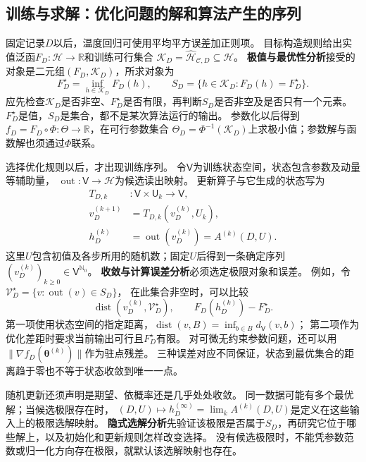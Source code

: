 \subsection{训练与求解：优化问题的解和算法产生的序列}
\label{sec:future-ml-training-solving}

固定记录$D$以后，温度回归可使用平均平方误差加正则项。
目标构造规则给出实值泛函$F_D:\mathcal H\to\mathbb R$和训练可行集合
$\mathcal K_D=\widehat{\mathcal H}_{\mathcal C,D}\subseteq\mathcal H$。
\textbf{极值与最优性分析}接受的对象是二元组$(F_D,\mathcal K_D)$，所求对象为
\[
  F_D^\star=\inf_{h\in\mathcal K_D}F_D(h),\qquad
  S_D=\{h\in\mathcal K_D:F_D(h)=F_D^\star\}.
\]
应先检查$\mathcal K_D$是否非空、$F_D^\star$是否有限，再判断$S_D$是否非空及是否只有一个元素。
$F_D^\star$是值，$S_D$是集合，都不是某次算法运行的输出。
参数化以后得到$f_D=F_D\circ\Phi:\Theta\to\mathbb R$，在可行参数集合
$\Theta_D=\Phi^{-1}(\mathcal K_D)$上求极小值；参数解与函数解也须通过$\Phi$联系。

选择优化规则以后，才出现训练序列。
令$\mathsf V$为训练状态空间，状态包含参数及动量等辅助量，
$\operatorname{out}:\mathsf V\to\mathcal H$为候选读出映射。
更新算子与它生成的状态写为
\begin{equation}
  \begin{aligned}
    T_{D,k}&:\mathsf V\times\mathsf U_k\to\mathsf V,\\
    v_D^{(k+1)}&=T_{D,k}(v_D^{(k)},U_k),\\
    h_D^{(k)}&=\operatorname{out}(v_D^{(k)})=A^{(k)}(D,U).
  \end{aligned}
  \label{eq:future-task-update-and-readout}
\end{equation}
这里$U$包含初值及各步所用的随机数；固定$U$后得到一条确定序列
$(v_D^{(k)})_{k\geq0}\in\mathsf V^{\mathbb N_0}$。
\textbf{收敛与计算误差分析}必须选定极限对象和误差。
例如，令$\mathcal V_D^\star=\{v:\operatorname{out}(v)\in S_D\}$，
在此集合非空时，可以比较
\[
  \operatorname{dist}(v_D^{(k)},\mathcal V_D^\star),
  \qquad F_D(h_D^{(k)})-F_D^\star.
\]
第一项使用状态空间的指定距离，$\operatorname{dist}(v,B)=\inf_{b\in B}d_{\mathsf V}(v,b)$；
第二项作为优化差距时要求当前输出可行且$F_D^\star$有限。
对可微无约束参数问题，还可以用$\lVert\nabla f_D(\bm\theta^{(k)})\rVert$作为驻点残差。
三种误差对应不同保证，状态到最优集合的距离趋于零也不等于状态收敛到唯一一点。

随机更新还须声明是期望、依概率还是几乎处处收敛。
同一数据可能有多个最优解；当候选极限存在时，
$(D,U)\mapsto h_D^{(\infty)}=\lim_k A^{(k)}(D,U)$是定义在这些输入上的极限选解映射。
\textbf{隐式选解分析}先验证该极限是否属于$S_D$，再研究它位于哪些解上，以及初始化和更新规则怎样改变选择。
没有候选极限时，不能凭参数范数或归一化方向存在极限，就默认该选解映射也存在。

